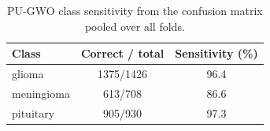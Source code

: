 \begin{table}[t]
\centering
\caption{PU-GWO class sensitivity from the confusion matrix pooled over all folds.}
\label{tab:table8_class_sensitivity}
\small
\begin{tabular}{lcc}
\toprule
Class & Correct / total & Sensitivity (\%) \\
\midrule
glioma & 1375/1426 & 96.4 \\
meningioma & 613/708 & 86.6 \\
pituitary & 905/930 & 97.3 \\
\bottomrule
\end{tabular}
\end{table}
